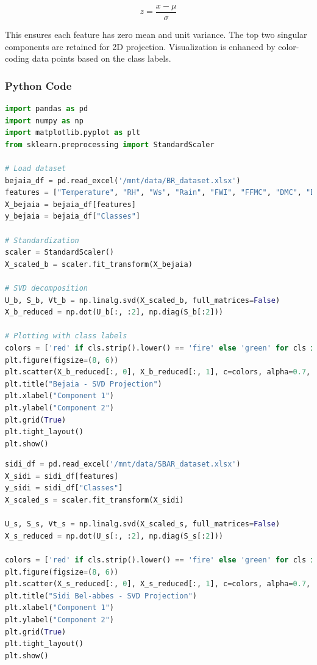 \documentclass[12pt]{article}
\begin{document}
\[
z = \frac{x - \mu}{\sigma}
\]

This ensures each feature has zero mean and unit variance. The top two singular components are retained for 2D projection. Visualization is enhanced by color-coding data points based on the class labels.

\subsubsection*{Python Code}

\begin{lstlisting}[language=Python, caption=Bejaia Dataset - SVD Projection]
import pandas as pd
import numpy as np
import matplotlib.pyplot as plt
from sklearn.preprocessing import StandardScaler

# Load dataset
bejaia_df = pd.read_excel('/mnt/data/BR_dataset.xlsx')
features = ["Temperature", "RH", "Ws", "Rain", "FWI", "FFMC", "DMC", "DC", "ISI", "BUI"]
X_bejaia = bejaia_df[features]
y_bejaia = bejaia_df["Classes"]

# Standardization
scaler = StandardScaler()
X_scaled_b = scaler.fit_transform(X_bejaia)

# SVD decomposition
U_b, S_b, Vt_b = np.linalg.svd(X_scaled_b, full_matrices=False)
X_b_reduced = np.dot(U_b[:, :2], np.diag(S_b[:2]))

# Plotting with class labels
colors = ['red' if cls.strip().lower() == 'fire' else 'green' for cls in y_bejaia]
plt.figure(figsize=(8, 6))
plt.scatter(X_b_reduced[:, 0], X_b_reduced[:, 1], c=colors, alpha=0.7, edgecolor='k')
plt.title("Bejaia - SVD Projection")
plt.xlabel("Component 1")
plt.ylabel("Component 2")
plt.grid(True)
plt.tight_layout()
plt.show()
\end{lstlisting}

\begin{lstlisting}[language=Python, caption=Sidi Bel-abbes Dataset - SVD Projection]
sidi_df = pd.read_excel('/mnt/data/SBAR_dataset.xlsx')
X_sidi = sidi_df[features]
y_sidi = sidi_df["Classes"]
X_scaled_s = scaler.fit_transform(X_sidi)

U_s, S_s, Vt_s = np.linalg.svd(X_scaled_s, full_matrices=False)
X_s_reduced = np.dot(U_s[:, :2], np.diag(S_s[:2]))

colors = ['red' if cls.strip().lower() == 'fire' else 'green' for cls in y_sidi]
plt.figure(figsize=(8, 6))
plt.scatter(X_s_reduced[:, 0], X_s_reduced[:, 1], c=colors, alpha=0.7, edgecolor='k')
plt.title("Sidi Bel-abbes - SVD Projection")
plt.xlabel("Component 1")
plt.ylabel("Component 2")
plt.grid(True)
plt.tight_layout()
plt.show()
\end{lstlisting}
\end{document}

